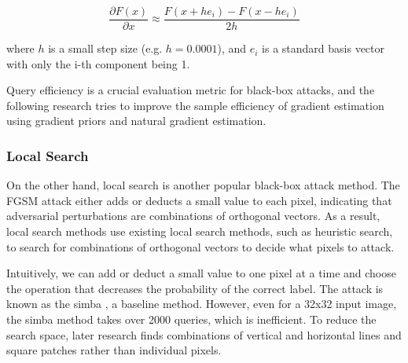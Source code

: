 \begin{equation}
    \frac{\partial F(x)}{\partial x} \approx \frac{F(x+he_i) - F(x-he_i)}{2h}
\end{equation}


where $h$ is a small step size (e.g. $h = 0.0001$), and $e_i$ is a standard basis vector with only the i-th component being 1.

Query efficiency is a crucial evaluation metric for black-box attacks, and the following research tries to improve the sample efficiency of gradient estimation using gradient priors and natural gradient estimation.



\subsubsection{Local Search}

On the other hand, local search is another popular black-box attack method. The FGSM attack either adds or deducts a small value to each pixel, indicating that adversarial perturbations are combinations of orthogonal vectors. As a result, local search methods use existing local search methods, such as heuristic search, to search for combinations of orthogonal vectors to decide what pixels to attack.

Intuitively, we can add or deduct a small value to one pixel at a time and choose the operation that decreases the probability of the correct label. The attack is known as the \acrfull{simba} \cite{guo2019simple}, a baseline method. However, even for a 32x32 input image, the \acrshort{simba} method takes over 2000 queries, which is inefficient. To reduce the search space, later research finds combinations of vertical and horizontal lines and square patches rather than individual pixels.

\clearpage

